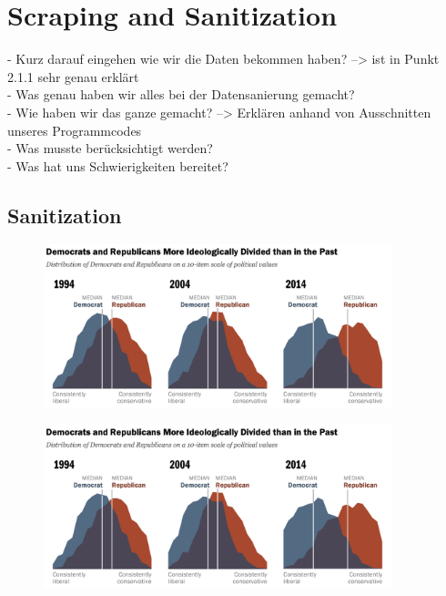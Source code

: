 \section{Scraping and Sanitization}
	
	- Kurz darauf eingehen wie wir die Daten bekommen haben? --> ist in Punkt 2.1.1 sehr genau erklärt\\
	- Was genau haben wir alles bei der Datensanierung gemacht?\\
	- Wie haben wir das ganze gemacht? --> Erklären anhand von Ausschnitten unseres Programmcodes\\
	- Was musste berücksichtigt werden?\\
	- Was hat uns Schwierigkeiten bereitet?	
	
	
	\subsection{Sanitization}
	
	
	
	\begin{figure}[ht]
		\centering
		\includegraphics[width=0.9\textwidth]{images/Kapitel1/PoliticalPolarization}
	\end{figure}
	
	

	
	
	\begin{figure}[ht]
		\centering
		\includegraphics[width=0.9\textwidth]{images/Kapitel1/PoliticalPolarization}
	\end{figure}
	
	
